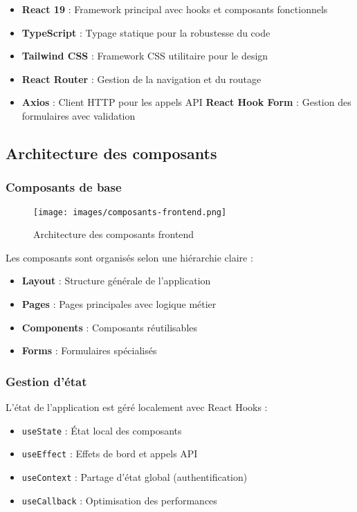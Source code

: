 \begin{itemize}
    \item \textbf{React 19} : Framework principal avec hooks et composants fonctionnels
    \item \textbf{TypeScript} : Typage statique pour la robustesse du code
    \item \textbf{Tailwind CSS} : Framework CSS utilitaire pour le design
    \item \textbf{React Router} : Gestion de la navigation et du routage
    \item \textbf{Axios} : Client HTTP pour les appels API
    \textbf{React Hook Form} : Gestion des formulaires avec validation
\end{itemize}

\subsection{Architecture des composants}
\subsubsection{Composants de base}
\begin{figure}[h]
\centering
\texttt{[image: images/composants-frontend.png]}
\caption{Architecture des composants frontend}
\label{fig:composants-frontend}
\end{figure}

Les composants sont organisés selon une hiérarchie claire :
\begin{itemize}
    \item \textbf{Layout} : Structure générale de l'application
    \item \textbf{Pages} : Pages principales avec logique métier
    \item \textbf{Components} : Composants réutilisables
    \item \textbf{Forms} : Formulaires spécialisés
\end{itemize}

\subsubsection{Gestion d'état}
L'état de l'application est géré localement avec React Hooks :
\begin{itemize}
    \item \texttt{useState} : État local des composants
    \item \texttt{useEffect} : Effets de bord et appels API
    \item \texttt{useContext} : Partage d'état global (authentification)
    \item \texttt{useCallback} : Optimisation des performances
\end{itemize}

